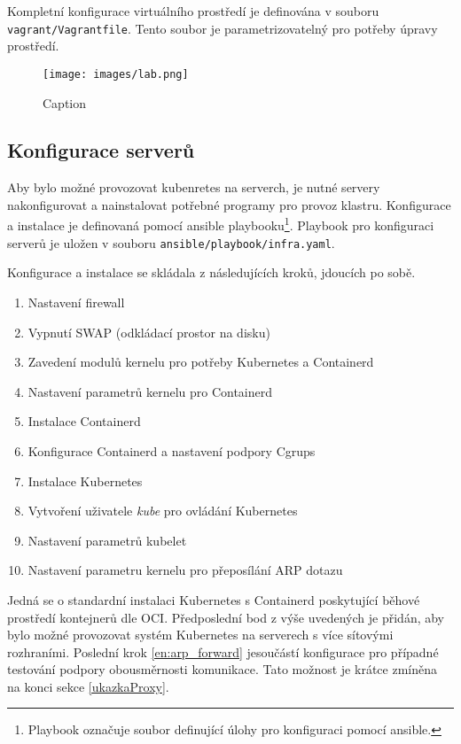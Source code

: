Kompletní konfigurace virtuálního prostředí je definována v souboru \verb|vagrant/Vagrantfile|. Tento soubor je parametrizovatelný pro potřeby úpravy prostředí. 
\begin{figure}[ht]
    \centering
    \texttt{[image: images/lab.png]}
    \caption{Caption}
    \label{fig:lab}
\end{figure}

\subsection{Konfigurace serverů}
Aby bylo možné provozovat kubenretes na serverch, je nutné servery nakonfigurovat a nainstalovat potřebné programy pro provoz klastru. Konfigurace a instalace je definovaná pomocí ansible playbooku\footnote{Playbook označuje soubor definující úlohy pro konfiguraci pomocí ansible.}. Playbook pro konfiguraci serverů je uložen v souboru \verb|ansible/playbook/infra.yaml|.

Konfigurace a instalace se skládala z následujících kroků, jdoucích po sobě.
\begin{enumerate}
    \item Nastavení firewall
    \item Vypnutí SWAP (odkládací prostor na disku)
    \item Zavedení modulů kernelu pro potřeby Kubernetes a Containerd
    \item Nastavení parametrů kernelu pro Containerd
    \item Instalace Containerd
    \item Konfigurace Containerd a nastavení podpory Cgrups
    \item Instalace Kubernetes
    \item Vytvoření uživatele \textit{kube} pro ovládání Kubernetes
    \item Nastavení parametrů kubelet\label{en:ip_set}
    \item Nastavení parametru kernelu pro přeposílání ARP dotazu\label{en:arp_forward}
\end{enumerate}
Jedná se o standardní instalaci Kubernetes s Containerd poskytující běhové prostředí kontejnerů dle OCI. Předposlední bod z výše uvedených je přidán, aby bylo možné provozovat systém Kubernetes na serverech s více sítovými rozhraními. Poslední krok \ref{en:arp_forward} jesoučástí konfigurace pro případné testování podpory obousměrnosti komunikace. Tato možnost je krátce zmíněna na konci sekce \ref{ukazkaProxy}.

